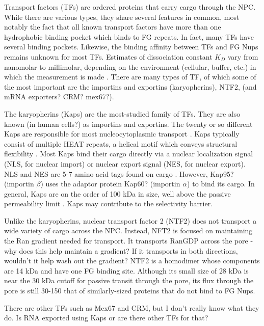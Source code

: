 Transport factors (TFs) are ordered proteins that carry cargo through the NPC.  While there are various types, they share several features in common, most notably the fact that all known transport factors have more than one hydrophobic binding pocket which binds to FG repeats.  In fact, many TFs have several binding pockets.  Likewise, the binding affinity between TFs and FG Nups remains unknown for most TFs.  Estimates of dissociation constant $K_D$ vary from nanomolar to millimolar, depending on the environment (cellular, buffer, etc.) in which the measurement is made \cite{things}. There are many types of TF, of which some of the most important are the importins and exportins (karyopherins), NTF2, (and mRNA exporters? CRM? mex67?).

The karyopherins (Kaps) are the most-studied family of TFs.  They are also known (in human cells?) as importins and exportins.  The twenty or so different Kaps are responsible for most nucleocytoplasmic transport \cite{kapinos17}.  Kaps typically consist of multiple HEAT repeats, a helical motif which conveys structural flexibility \cite{yoshimura16}.  Most Kaps bind their cargo directly via a nuclear localization signal (NLS, for nuclear import) or nuclear export signal (NES, for nuclear export).  NLS and NES are 5-7 amino acid tags found on cargo \cite{}.  However, Kap95? (importin $\beta$) uses the adaptor protein Kap60? (importin $\alpha$) to bind its cargo. In general, Kaps are on the order of 100 kDa in size, well above the passive permeability limit \cite{}. Kaps may contribute to the selectivity barrier.

Unlike the karyopherins, nuclear transport factor 2 (NTF2) does not transport a wide variety of cargo across the NPC.  Instead, NFT2 is focused on maintaining the Ran gradient needed for transport.  It transports RanGDP across the pore - why does this help maintain a gradient?  If it transports in both directions, wouldn't it help wash out the gradient?  NTF2 is a homodimer whose components are 14 kDa and have one FG binding site.  Although its small size of 28 kDa is near the 30 kDa cutoff for passive transit through the pore, its flux through the pore is still 30-150 that of similarly-sized proteins that do not bind to FG Nups.

There are other TFs such as Mex67 and CRM, but I don't really know what they do.  Is RNA exported using Kaps or are there other TFs for that?

